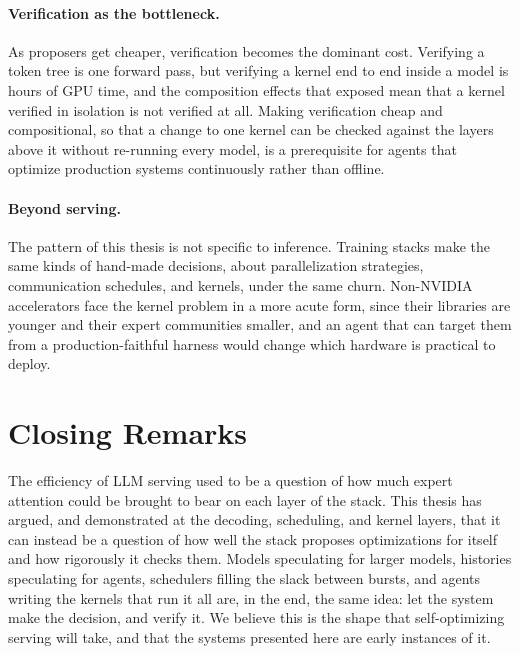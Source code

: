\paragraph{Verification as the bottleneck.}
As proposers get cheaper, verification becomes the dominant cost.
Verifying a token tree is one forward pass, but verifying a kernel end to end inside a model is hours of GPU time, and the composition effects that \FastKernels exposed mean that a kernel verified in isolation is not verified at all.
Making verification cheap and compositional, so that a change to one kernel can be checked against the layers above it without re-running every model, is a prerequisite for agents that optimize production systems continuously rather than offline.

\paragraph{Beyond serving.}
The pattern of this thesis is not specific to inference.
Training stacks make the same kinds of hand-made decisions, about parallelization strategies, communication schedules, and kernels, under the same churn.
Non-NVIDIA accelerators face the kernel problem in a more acute form, since their libraries are younger and their expert communities smaller, and an agent that can target them from a production-faithful harness would change which hardware is practical to deploy.

\section{Closing Remarks}
\label{conclusion:sec:closing}

The efficiency of LLM serving used to be a question of how much expert attention could be brought to bear on each layer of the stack.
This thesis has argued, and demonstrated at the decoding, scheduling, and kernel layers, that it can instead be a question of how well the stack proposes optimizations for itself and how rigorously it checks them.
Models speculating for larger models, histories speculating for agents, schedulers filling the slack between bursts, and agents writing the kernels that run it all are, in the end, the same idea: let the system make the decision, and verify it.
We believe this is the shape that self-optimizing serving will take, and that the systems presented here are early instances of it.
